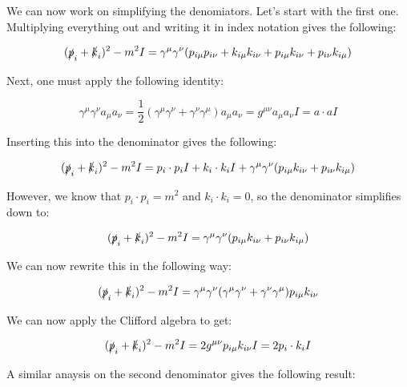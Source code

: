 \documentclass[a4]{article}
\begin{document}
    We can now work on simplifying the denomiators. Let's start with the first one. Multiplying everything out and writing it in index notation gives the following:

    \begin{equation}
        (\slashed{p}_i + \slashed{k}_i)^2 - m^2 I = \gamma^{\mu} \gamma^{\nu} (p_{i \mu} p_{i \nu} + k_{i \mu} k _{i \nu} + p_{i \mu} k_{i \nu} + p_{i \nu} k_{i \mu})
    \end{equation}

    Next, one must apply the following identity:

    \begin{equation}
        \gamma^{\mu} \gamma^{\nu} a_{\mu} a_{\nu} = \frac{1}{2} (\gamma^{\mu} \gamma^{\nu} + \gamma^{\nu} \gamma^{\mu}) a_{\mu} a_{\nu} = g^{\mu \nu} a_{\mu} a_{\nu} I = a \cdot a I
    \end{equation}

    Inserting this into the denominator gives the following: 

    \begin{equation}
        (\slashed{p}_i + \slashed{k}_i)^2 - m^2 I = p_i \cdot p_i I + k_i \cdot k_i I + \gamma^{\mu} \gamma^{\nu} (p_{i \mu} k_{i \nu} + p_{i \nu} k_{i \mu})
    \end{equation}

    However, we know that $p_i \cdot p_i = m^2$ and $k_i \cdot k_i = 0$, so the denominator simplifies down to:

    \begin{equation}
        (\slashed{p}_i + \slashed{k}_i)^2 - m^2 I = \gamma^{\mu} \gamma^{\nu} (p_{i \mu} k_{i \nu} + p_{i \nu} k_{i \mu})
    \end{equation}

    We can now rewrite this in the following way:

    \begin{equation}
        (\slashed{p}_i + \slashed{k}_i)^2 - m^2 I = \gamma^{\mu} \gamma^{\nu} (\gamma^{\mu} \gamma^{\nu} + \gamma^{\nu} \gamma^{\mu}) p_{i \mu} k_{i \nu}
    \end{equation}

    We can now apply the Clifford algebra to get:

    \begin{equation}
        (\slashed{p}_i + \slashed{k}_i)^2 - m^2 I = 2 g^{\mu \nu} p_{i \mu} k_{i \nu} I = 2 p_i \cdot k_i I
    \end{equation}

    A similar anaysis on the second denominator gives the following result:
\end{document}
